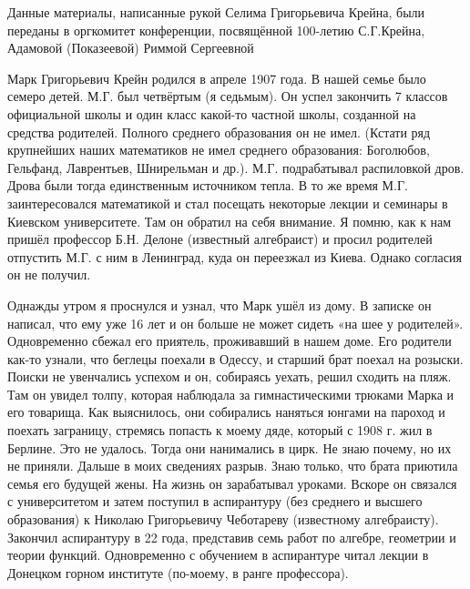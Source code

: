 
\vzmscaption

\begin{flushright}
Данные материалы,
написанные рукой Селима Григорьевича Крейна,
были переданы в оргкомитет конференции,
посвящённой 100-летию С.Г.Крейна,
 Адамовой (Показеевой) Риммой  Сергеевной
\end{flushright}

Марк Григорьевич Крейн родился в апреле 1907 года. В нашей семье было семеро детей. М.Г. был четвёртым (я седьмым). Он успел закончить 7 классов официальной школы и один класс какой-то частной школы, созданной на средства родителей. Полного среднего образования он не имел. (Кстати ряд крупнейших наших математиков не имел среднего образования: Боголюбов, Гельфанд, Лаврентьев, Шнирельман и др.). М.Г. подрабатывал распиловкой дров. Дрова были тогда единственным источником тепла. В то же время М.Г. заинтересовался математикой и стал посещать некоторые лекции и семинары в Киевском университете. Там он обратил на себя внимание. Я помню, как к нам пришёл профессор Б.Н. Делоне (известный алгебраист) и просил родителей отпустить М.Г. с ним в Ленинград, куда он переезжал из Киева. Однако согласия он не получил.

Однажды утром я проснулся и узнал, что Марк ушёл из дому. В записке он написал, что ему уже 16 лет и он больше не может сидеть «на шее у родителей». Одновременно сбежал его приятель, проживавший в нашем доме. Его родители как-то узнали, что беглецы поехали в Одессу, и старший брат поехал на розыски. Поиски не увенчались успехом и он, собираясь уехать, решил сходить на пляж. Там он увидел толпу, которая наблюдала за гимнастическими трюками Марка и его товарища. Как выяснилось, они собирались наняться юнгами на пароход и поехать заграницу, стремясь попасть к моему дяде, который с 1908 г. жил в Берлине. Это не удалось. Тогда они нанимались в цирк. Не знаю почему, но их не приняли. Дальше в моих сведениях разрыв. Знаю только, что брата приютила семья его будущей жены. На жизнь он зарабатывал уроками. Вскоре он связался с университетом и затем поступил в аспирантуру (без среднего и высшего образования) к Николаю Григорьевичу Чеботареву (известному алгебраисту). Закончил аспирантуру в 22 года, представив семь работ по алгебре, геометрии и теории функций. Одновременно с обучением в аспирантуре читал лекции в Донецком горном институте (по-моему, в ранге профессора).

